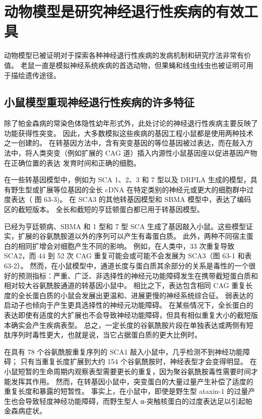 \section{动物模型是研究神经退行性疾病的有效工具}
动物模型已被证明对于探索各种神经退行性疾病的发病机制和研究疗法非常有价值。 老鼠一直是模拟神经系统疾病的首选动物，但果蝇和线虫线虫也被证明可用于描绘遗传途径。

\subsection{小鼠模型重现神经退行性疾病的许多特征}
除了帕金森病的常染色体隐性幼年形式外，此处讨论的神经退行性疾病主要反映了功能获得性突变。 因此，大多数模拟这些疾病的基因工程小鼠都是使用两种技术之一创建的。 在转基因方法中，含有突变基因的等位基因被过表达，而在敲入方法中，将人类突变（例如扩展的 CAG 道）插入内源性小鼠基因座以促进基因产物在正确位置的表达 发育时间和正确的细胞。

在一些转基因模型中，例如为 SCA 1、2、3 和 7 型以及 DRPLA 生成的模型，具有野生型或扩展等位基因的全长 cDNA 在特定类别的神经元或更大的细胞群中过度表达（ 图 63-3)。 在 SCA3 的其他转基因模型和 SBMA 模型中，表达了编码区的截短版本。 全长和截短的亨廷顿蛋白都已用于转基因模型。

已经为亨廷顿病、SBMA 和 1 型和 7 型 SCA 生成了基因敲入小鼠。这些模型证实，扩展的谷氨酰胺道以外的序列可以产生有毒蛋白质。 此外，两种不同宿主蛋白的相同扩增会对细胞产生不同的影响。 例如，在人类中，33 次重复导致 SCA2，而 44 到 52 次 CAG 重复可能会或可能不会发展为 SCA3（图 63-1 和表 63-2）。 然而，在小鼠模型中，通道长度与蛋白质其余部分的关系是毒性的一个很好的预测指标：严重、广泛、非选择性的神经元功能障碍发生在携带截短蛋白质和相对较大谷氨酰胺通道的转基因小鼠中。 相比之下，表达包含相同 CAG 重复长度的全长蛋白质的小鼠会发展出更温和、进展更慢的神经系统综合征。 弱表达的启动子也倾向于产生更具选择性的神经元功能障碍。 在某些情况下，全长蛋白的表达即使有适度的大扩展也不会导致神经功能障碍，但具有相似重复大小的截短版本确实会产生疾病表型。 总之，一定长度的谷氨酰胺片段在单独表达或两侧有短肽序列时毒性更大，也就是说，当它占据蛋白质的更大比例时。

在具有 78 个谷氨酰胺重复序列的 SCA1 敲入小鼠中，几乎检测不到神经功能障碍； 只有当重复长度扩展到大约 154 个谷氨酰胺时，神经表型才会变得明显。 在小鼠短暂的生命周期内观察表型需要更长的重复，因为聚谷氨酰胺毒性需要时间才能发挥其作用。 然而，在转基因小鼠中，突变蛋白的大量过量产生补偿了适度的重复长度和暴露的短暂性。 事实上，在小鼠中，即使是野生型 ataxin-1 的过量产生也会导致轻度神经功能障碍，而野生型人 α-突触核蛋白的过度表达足以引起帕金森病症状。


